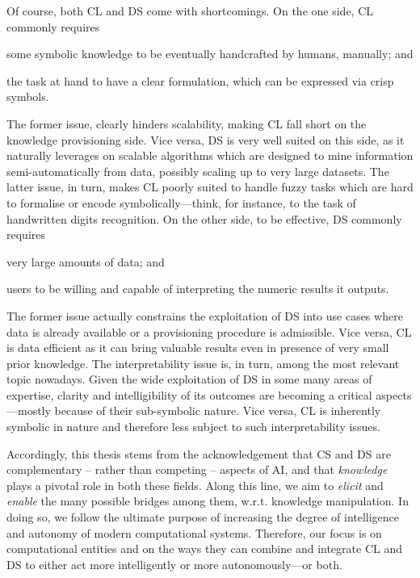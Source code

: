 \documentclass[12pt,a4paper,openright,twoside]{book}
\begin{document}
Of course, both CL and DS come with shortcomings.
%
On the one side, CL commonly requires
%
\begin{inlinelist}
    \item some symbolic knowledge to be eventually handcrafted by humans, manually; and
    \item the task at hand to have a clear formulation, which can be expressed via crisp symbols.
\end{inlinelist}
%
The former issue, clearly hinders scalability, making CL fall short on the knowledge provisioning side.
%
Vice versa, DS is very well suited on this side, as it naturally leverages on scalable algorithms which are designed to mine information semi-automatically from data, possibly scaling up to very large datasets.
%
The latter issue, in turn, makes CL poorly suited to handle fuzzy tasks which are hard to formalise or encode symbolically---think, for instance, to the task of handwritten digits recognition.
%
On the other side, to be effective, DS commonly requires
%
\begin{inlinelist}
    \item very large amounts of data; and
    \item users to be willing and capable of interpreting the numeric results it outputs.
\end{inlinelist}
%
The former issue actually constrains the exploitation of DS into use cases where data is already available or a provisioning procedure is admissible.
%
Vice versa, CL is data efficient as it can bring valuable results even in presence of very small prior knowledge.
%
The interpretability issue is, in turn, among the most relevant topic nowadays.
%
Given the wide exploitation of DS in some many areas of expertise, clarity and intelligibility of its outcomes are becoming a critical aspects---mostly because of their sub-symbolic nature.
%
Vice versa, CL is inherently symbolic in nature and therefore less subject to such interpretability issues.

Accordingly, this thesis stems from the acknowledgement that CS and DS are complementary -- rather than competing -- aspects of AI, and that \emph{knowledge} plays a pivotal role in both these fields.
%
Along this line, we aim to \emph{elicit} and \emph{enable} the many possible bridges among them, w.r.t. knowledge manipulation.
%
In doing so, we follow the ultimate purpose of increasing the degree of intelligence and autonomy of modern computational systems.
%
Therefore, our focus is on computational entities and on the ways they can combine and integrate CL and DS to either act more intelligently or more autonomously---or both.
\end{document}
